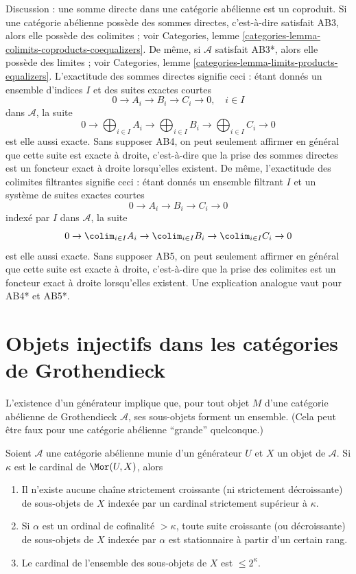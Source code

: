 \noindent
Discussion : une somme directe dans une catégorie abélienne est un coproduit.
Si une catégorie abélienne possède des sommes directes, c'est-à-dire satisfait
AB3, alors elle possède des colimites ; voir
Categories, lemme \ref{categories-lemma-colimits-coproducts-coequalizers}. 
De même, si $\mathcal{A}$ satisfait AB3*, alors elle possède des limites ; voir
Categories, lemme \ref{categories-lemma-limits-products-equalizers}. 
L'exactitude des sommes directes signifie ceci : étant donnés un ensemble
d'indices $I$ et des suites exactes courtes
$$
0 \to A_i \to B_i \to C_i \to 0,\quad i \in I
$$
dans $\mathcal{A}$, la suite
$$
0 \to
\bigoplus\nolimits_{i \in I} A_i \to
\bigoplus\nolimits_{i \in I} B_i \to
\bigoplus\nolimits_{i \in I} C_i \to 0
$$
est elle aussi exacte. Sans supposer AB4, on peut seulement affirmer en général
que cette suite est exacte à droite, c'est-à-dire que la prise des sommes
directes est un foncteur exact à droite lorsqu'elles existent. De même,
l'exactitude des colimites filtrantes signifie ceci : étant donnés un ensemble
filtrant $I$ et un système de suites exactes courtes
$$
0 \to A_i \to B_i \to C_i \to 0
$$
indexé par $I$ dans $\mathcal{A}$, la suite
$$
0 \to
\colim_{i \in I} A_i \to
\colim_{i \in I} B_i \to
\colim_{i \in I} C_i \to 0
$$
est elle aussi exacte. Sans supposer AB5, on peut seulement affirmer en général
que cette suite est exacte à droite, c'est-à-dire que la prise des colimites
est un foncteur exact à droite lorsqu'elles existent. Une explication analogue
vaut pour AB4* et AB5*.
\section{Objets injectifs dans les catégories de Grothendieck}
\label{section-grothendieck-categories}

\noindent
L'existence d'un générateur implique que, pour tout objet $M$ d'une
catégorie abélienne de Grothendieck $\mathcal{A}$, ses sous-objets
forment un ensemble. (Cela peut être faux pour une catégorie abélienne
``grande'' quelconque.)

\begin{lemma}
\label{lemma-set-of-subobjects}
Soient $\mathcal{A}$ une catégorie abélienne munie d'un générateur $U$ et
$X$ un objet de $\mathcal{A}$. Si $\kappa$ est le cardinal de
$\Mor(U, X)$, alors
\begin{enumerate}
\item Il n'existe aucune chaîne strictement croissante
(ni strictement décroissante) de sous-objets de $X$ indexée par
un cardinal strictement supérieur à $\kappa$.
\item Si $\alpha$ est un ordinal de cofinalité $> \kappa$,
toute suite croissante (ou décroissante) de sous-objets de $X$
indexée par $\alpha$ est stationnaire à partir d'un certain rang.
\item Le cardinal de l'ensemble des sous-objets de $X$
est $\leq 2^\kappa$.
\end{enumerate}
\end{lemma}

